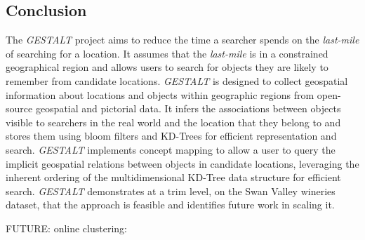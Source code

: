 \subsection{Conclusion}
The \textit{GESTALT} project aims to reduce the time a searcher spends on the \textit{last-mile} of searching for a location. 
It assumes that the \textit{last-mile} is in a constrained geographical region and allows users to search for objects they are likely to remember from candidate locations. 
\textit{GESTALT} is designed to collect geospatial information about locations and objects within geographic regions from open-source geospatial and pictorial data. 
It infers the associations between objects visible to searchers in the real world and the location that they belong to and stores them using bloom filters and KD-Trees for efficient representation and search.
\textit{GESTALT} implements concept mapping to allow a user to query the implicit geospatial relations between objects in candidate locations, leveraging the inherent ordering of the multidimensional KD-Tree data structure for efficient search. 
\textit{GESTALT} demonstrates at a trim level, on the Swan Valley wineries dataset, that the approach is feasible and identifies future work in scaling it.


FUTURE: online clustering: \cite{Montiel2021}